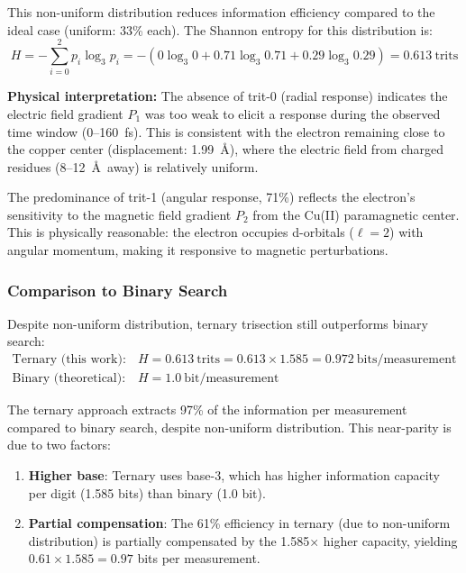 \documentclass[twocolumn,10pt]{article}
\begin{document}
This non-uniform distribution reduces information efficiency compared to the 
ideal case (uniform: 33\% each). The Shannon entropy for this distribution is:
%
\begin{equation}
H = -\sum_{i=0}^{2} p_i \log_3 p_i = -(0 \log_3 0 + 0.71 \log_3 0.71 + 0.29 \log_3 0.29) = 0.613~\text{trits}
\label{eq:shannon_observed}
\end{equation}

\textbf{Physical interpretation:} The absence of trit-0 (radial response) 
indicates the electric field gradient $P_1$ was too weak to elicit a response 
during the observed time window (0--160~fs). This is consistent with the electron 
remaining close to the copper center (displacement: 1.99~\AA), where the electric 
field from charged residues (8--12~\AA\ away) is relatively uniform.

The predominance of trit-1 (angular response, 71\%) reflects the electron's 
sensitivity to the magnetic field gradient $P_2$ from the Cu(II) paramagnetic 
center. This is physically reasonable: the electron occupies d-orbitals 
($\ell = 2$) with angular momentum, making it responsive to magnetic perturbations.



\subsubsection{Comparison to Binary Search}

Despite non-uniform distribution, ternary trisection still outperforms binary 
search:
%
\begin{align}
\text{Ternary (this work):} \quad & H = 0.613~\text{trits} = 0.613 \times 1.585 = 0.972~\text{bits/measurement} \\
\text{Binary (theoretical):} \quad & H = 1.0~\text{bit/measurement}
\end{align}

The ternary approach extracts 97\% of the information per measurement compared 
to binary search, despite non-uniform distribution. This near-parity is due to 
two factors:
%
\begin{enumerate}
\item \textbf{Higher base}: Ternary uses base-3, which has higher information 
capacity per digit (1.585 bits) than binary (1.0 bit).

\item \textbf{Partial compensation}: The 61\% efficiency in ternary (due to 
non-uniform distribution) is partially compensated by the 1.585× higher capacity, 
yielding $0.61 \times 1.585 = 0.97$ bits per measurement.
\end{enumerate}
\end{document}
